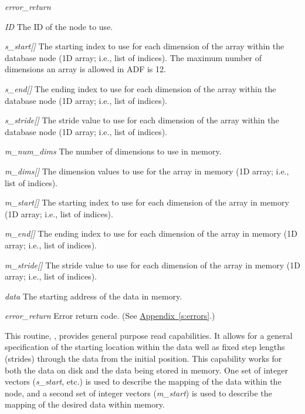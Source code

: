 \begin{Ventryi}{\textit{error\_return}}
\item[\textit{ID}]
     The ID of the node to use.
\item[\textit{s\_start[]}]
     The starting index to use for each dimension of the array within
     the database node (1D array; i.e., list of indices).
     The maximum number of dimensions an array is allowed in ADF is 12.
\item[\textit{s\_end[]}]
     The ending index to use for each dimension of the array within
     the database node (1D array; i.e., list of indices).
\item[\textit{s\_stride[]}]
     The stride value to use for each dimension of the array within
     the database node (1D array; i.e., list of indices).
\item[\textit{m\_num\_dims}]
     The number of dimensions to use in memory.
\item[\textit{m\_dims[]}]
     The dimension values to use for the array in memory (1D array;
     i.e., list of indices).
\item[\textit{m\_start[]}]
     The starting index to use for each dimension of the array in
     memory (1D array; i.e., list of indices).
\item[\textit{m\_end[]}]
     The ending index to use for each dimension of the array in
     memory (1D array; i.e., list of indices).
\item[\textit{m\_stride[]}]
     The stride value to use for each dimension of the array in
     memory (1D array; i.e., list of indices).
\item[\textit{data}]
     The starting address of the data in memory.
\item[\textit{error\_return}]
     Error return code.
     (See \hyperref[s:errors]{Appendix~\ref*{s:errors}}.)
\end{Ventryi}

This routine, , provides general purpose read
capabilities.
It allows for a general specification of the starting location within
the data well as fixed step lengths (strides) through the data from the
initial position.
This capability works for both the data on disk and the data being
stored in memory.
One set of integer vectors (\textit{s\_start}, etc.) is used to
describe the mapping of the data within the node, and a second set
of integer vectors (\textit{m\_start}) is used to describe the
mapping of the desired data within memory.

